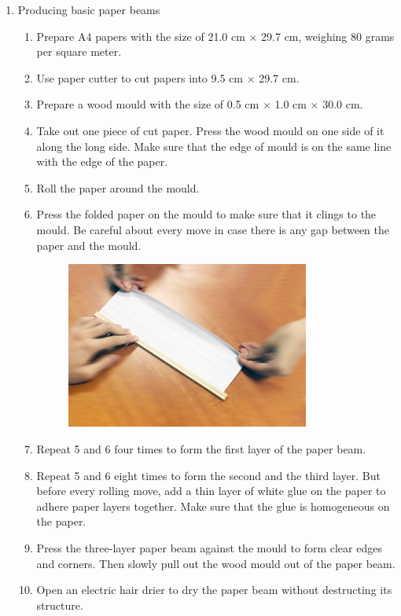 \begin{enumerate}
\item Producing basic paper beams
	\begin{enumerate}
	\item Prepare A4 papers with the size of 21.0 cm $\times$ 29.7 cm, weighing 80 grams per square meter.
	\item Use paper cutter to cut papers into 9.5 cm $\times$ 29.7 cm.
	\item Prepare a wood mould with the size of 0.5 cm $\times$ 1.0 cm $\times$ 30.0 cm.
	\item Take out one piece of cut paper. Press the wood mould on one side of it along the long side. Make sure that the edge of mould is on the same line with the edge of the paper.
	\item Roll the paper around the mould. 
	\item Press the folded paper on the mould to make sure that it clings to the mould. Be careful about every move in case there is any gap between the paper and the mould.  
	\begin{figure}[H]
	\begin{center}
	\includegraphics[width=8cm]{figure/procedureJuanzhi/p1}
	\end{center}
	\end{figure}
	\item Repeat 5 and 6 four times to form the first layer of the paper beam.
	\item Repeat 5 and 6 eight times to form the second and the third layer. But before every rolling move, add a thin layer of white glue on the paper to adhere paper layers together. Make sure that the glue is homogeneous on the paper.
	\item Press the three-layer paper beam against the mould to form clear edges and corners. Then slowly pull out the wood mould out of the paper beam.
	\item Open an electric hair drier to dry the paper beam without destructing its structure.

\end{enumerate}
\end{enumerate}

